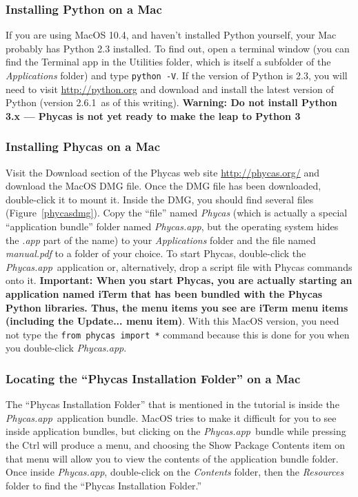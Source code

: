 \documentclass[10pt]{article}
\newcommand{\currPyVersion}{2.6.1}
\newcommand{\pathname}[1]{{\em #1}}				%
\newcommand{\menu}[1]{{\sf #1}}					%
\newcommand{\keycmd}[1]{{\sf #1}}					%
\newcommand{\code}[1]{{\tt #1}}					%
\newcommand{\important}[1]{{\bf Important: #1}}	%
\newcommand{\warning}[1]{{\bf Warning: #1}}		%
\newcommand{\warnNoPyThree}{\warning{Do not install Python 3.x --- Phycas is not yet ready to make the leap to Python 3}}
\newcommand{\phycasapp}{\pathname{Phycas.app}}
\begin{document}
\subsubsection{Installing Python on a Mac}

If you are using MacOS 10.4, and haven't installed Python yourself, your Mac probably has Python 2.3 installed. To find out, open a terminal window (you can find the Terminal app in the Utilities folder, which is itself a subfolder of the \pathname{Applications} folder) and type \code{python -V}. If the version of Python is 2.3, you will need to visit \url{http://python.org} and download and install the latest version of Python (version \currPyVersion\ as of this writing). \warnNoPyThree

\subsubsection{Installing Phycas on a Mac}

Visit the Download section of the Phycas web site \url{http://phycas.org/} and download the MacOS DMG file. Once the DMG file has been downloaded, double-click it to mount it. Inside the DMG, you should find several files (Figure~\ref{phycasdmg}). Copy the ``file'' named \pathname{Phycas} (which is actually a special ``application bundle'' folder named \phycasapp, but the operating system hides the \pathname{.app} part of the name) to your \pathname{Applications} folder and the file named \pathname{manual.pdf} to a folder of your choice. To start Phycas, double-click the \phycasapp\ application or, alternatively, drop a script file with Phycas commands onto it. \important{When you start Phycas, you are actually starting an application named iTerm that has been bundled with the Phycas Python libraries. Thus, the menu items you see are iTerm menu items (including the \menu{Update...} menu item)}. With this MacOS version, you need not type the \code{from phycas import *} command because this is done for you when you double-click \phycasapp.

\subsubsection{Locating the ``Phycas Installation Folder'' on a Mac} \label{subsubsec:installfoldermac}

The ``Phycas Installation Folder'' that is mentioned in the tutorial is inside the \phycasapp\ application bundle. MacOS tries to make it difficult for you to see inside application bundles, but clicking on the \phycasapp\ bundle while pressing the \keycmd{Ctrl} will produce a menu, and choosing the \menu{Show Package Contents} item on that menu will allow you to view the contents of the application bundle folder. Once inside \phycasapp, double-click on the \pathname{Contents} folder, then the \pathname{Resources} folder to find the ``Phycas Installation Folder.''
\end{document}
